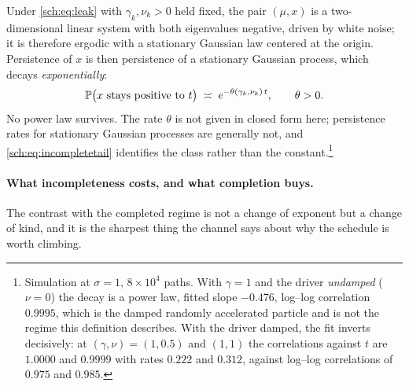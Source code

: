 \begin{proposition}\label{sch:prop:exponent}
Under \eqref{sch:eq:leak} with $\gamma_k,\nu_k>0$ held fixed, the pair
$(\mu,x)$ is a two-dimensional linear system with both eigenvalues
negative, driven by white noise; it is therefore ergodic with a
stationary Gaussian law centered at the origin. Persistence of $x$ is then
persistence of a stationary Gaussian process, which decays
\emph{exponentially}:
\begin{equation}\label{sch:eq:incompletetail}
\mathbb{P}\bigl(x\ \text{stays positive to }t\bigr)\;\asymp\;e^{-\theta(\gamma_k,\nu_k)\,t},
\qquad \theta>0 .
\end{equation}
No power law survives. The rate $\theta$ is not given in closed form
here; persistence rates for stationary Gaussian processes are generally
not, and \eqref{sch:eq:incompletetail} identifies the class rather than
the constant.\footnote{Simulation at $\sigma=1$, $8\times10^{4}$ paths.
With $\gamma=1$ and the driver \emph{undamped} ($\nu=0$) the decay is a
power law, fitted slope $-0.476$, log--log correlation $0.9995$, which is the damped randomly accelerated particle and is not the regime
this definition describes. With the driver damped, the fit inverts
decisively: at $(\gamma,\nu)=(1,0.5)$ and $(1,1)$ the correlations
against $t$ are $1.0000$ and $0.9999$ with rates $0.222$ and $0.312$,
against log--log correlations of $0.975$ and $0.985$.}
\end{proposition}

\paragraph{What incompleteness costs, and what completion buys.}\label{sch:rem:suspends}
The contrast with the completed regime is not a change of exponent but a
change of kind, and it is the sharpest thing the channel says about why
the schedule is worth climbing.

